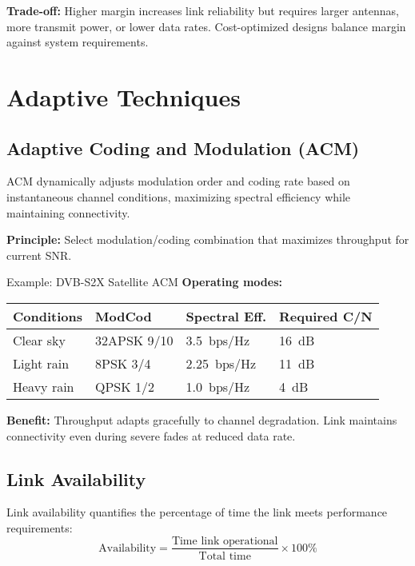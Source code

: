 \begin{keyconcept}
\textbf{Trade-off:} Higher margin increases link reliability but requires larger antennas, more transmit power, or lower data rates. Cost-optimized designs balance margin against system requirements.
\end{keyconcept}

\section{Adaptive Techniques}

\subsection{Adaptive Coding and Modulation (ACM)}

ACM dynamically adjusts modulation order and coding rate based on instantaneous channel conditions, maximizing spectral efficiency while maintaining connectivity.

\textbf{Principle:} Select modulation/coding combination that maximizes throughput for current SNR.

\begin{calloutbox}{Example: DVB-S2X Satellite ACM}
\textbf{Operating modes:}

\begin{center}
\begin{tabular}{@{}llll@{}}
\toprule
\textbf{Conditions} & \textbf{ModCod} & \textbf{Spectral Eff.} & \textbf{Required C/N} \\
\midrule
Clear sky & 32APSK 9/10 & 3.5~bps/Hz & 16~dB \\
Light rain & 8PSK 3/4 & 2.25~bps/Hz & 11~dB \\
Heavy rain & QPSK 1/2 & 1.0~bps/Hz & 4~dB \\
\bottomrule
\end{tabular}
\end{center}

\textbf{Benefit:} Throughput adapts gracefully to channel degradation. Link maintains connectivity even during severe fades at reduced data rate.
\end{calloutbox}

\subsection{Link Availability}

Link availability quantifies the percentage of time the link meets performance requirements:
\begin{equation}
\text{Availability} = \frac{\text{Time link operational}}{\text{Total time}} \times 100\%
\label{eq:availability}
\end{equation}


